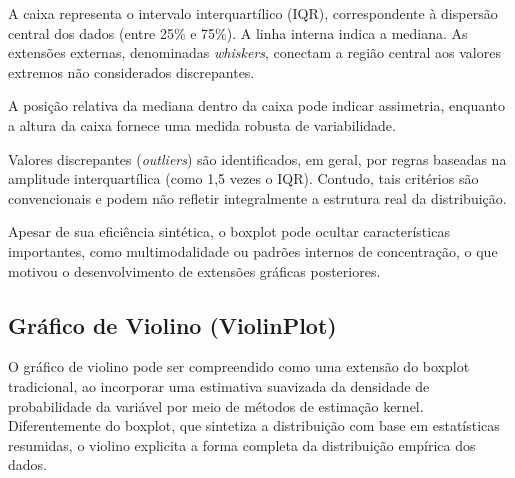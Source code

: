 A caixa representa o intervalo interquartílico (IQR), correspondente à dispersão central dos dados (entre 25\% e 75\%). A linha interna indica a mediana. As extensões externas, denominadas \textit{whiskers}, conectam a região central aos valores extremos não considerados discrepantes. \vskip0.3cm

A posição relativa da mediana dentro da caixa pode indicar assimetria, enquanto a altura da caixa fornece uma medida robusta de variabilidade. \vskip0.3cm

Valores discrepantes (\textit{outliers}) são identificados, em geral, por regras baseadas na amplitude interquartílica (como 1,5 vezes o IQR). Contudo, tais critérios são convencionais e podem não refletir integralmente a estrutura real da distribuição. \vskip0.3cm

Apesar de sua eficiência sintética, o boxplot pode ocultar características importantes, como multimodalidade ou padrões internos de concentração, o que motivou o desenvolvimento de extensões gráficas posteriores.




\subsection{Gráfico de Violino (ViolinPlot)}

O gráfico de violino pode ser compreendido como uma extensão do boxplot tradicional, ao incorporar uma estimativa suavizada da densidade de probabilidade da variável por meio de métodos de estimação kernel. Diferentemente do boxplot, que sintetiza a distribuição com base em estatísticas resumidas, o violino explicita a forma completa da distribuição empírica dos dados. \vskip0.3cm


